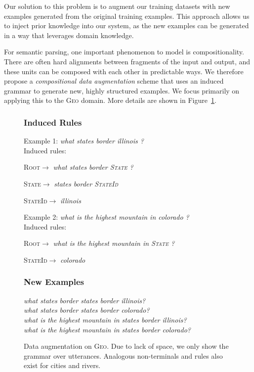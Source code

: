 \documentclass[11pt,letterpaper]{article}
\newcommand{\geo}{\textsc{Geo}\xspace}
\newcommand{\catroot}{\textsc{Root}\xspace}
\newcommand{\catstate}{\textsc{State}\xspace}
\newcommand{\catstateid}{\textsc{StateId}\xspace}
\newcommand\nl[1]{\textit{#1}}
\begin{document}
Our solution to this problem is to
augment our training datasets with new examples
generated from the original training examples.
This approach allows us to inject prior knowledge into our system,
as the new examples can be generated 
in a way that leverages domain knowledge.

For semantic parsing, one important phenomenon to model is compositionality.
There are often hard alignments between fragments
of the input and output, and these units can be composed
with each other in predictable ways.
We therefore propose a \emph{compositional data augmentation} scheme
that uses an induced grammar to generate new, highly structured examples.
We focus primarily on applying this to the \geo domain.
More details are shown in Figure~\ref{fig:augment-geo}.

\begin{figure}[t] 
\small
\begin{framed}
\footnotesize
\subsubsection*{Induced Rules}
Example 1: \nl{what states border illinois ?}\\
Induced rules:

\quad \catroot $\to$ \nl{what states border \catstate { }?}

\quad \catstate $\to$ \nl{states border \catstateid}

\quad \catstateid $\to$ \nl{illinois}

Example 2: \nl{what is the highest mountain in colorado ?}\\
Induced rules:

\quad \catroot $\to$ \nl{what is the highest mountain in \catstate { }?}

\quad \catstateid $\to$ \nl{colorado}

\subsubsection*{New Examples} 
\nl{what states border states border illinois?} \\
\nl{what states border states border colorado?} \\
\nl{what is the highest mountain in states border illinois?} \\
\nl{what is the highest mountain in states border colorado?}
\end{framed}
\caption{Data augmentation on \geo.  Due to lack of space,
we only show the grammar over utterances.
Analogous non-terminals and rules also exist for cities and rivers.}
\label{fig:augment-geo}
\end{figure}
\end{document}
